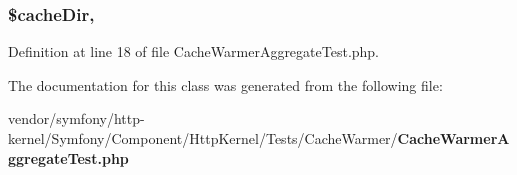 \subsubsection[{\$cache\+Dir}]{\setlength{\rightskip}{0pt plus 5cm}\$cache\+Dir\hspace{0.3cm}{\ttfamily [static]}, {\ttfamily [protected]}}\label{class_symfony_1_1_component_1_1_http_kernel_1_1_tests_1_1_cache_warmer_1_1_cache_warmer_aggregate_test_ac9d27ec635bd451cdecc1d20135f0698}


Definition at line 18 of file Cache\+Warmer\+Aggregate\+Test.\+php.



The documentation for this class was generated from the following file\+:\begin{DoxyCompactItemize}
\item 
vendor/symfony/http-\/kernel/\+Symfony/\+Component/\+Http\+Kernel/\+Tests/\+Cache\+Warmer/{\bf Cache\+Warmer\+Aggregate\+Test.\+php}\end{DoxyCompactItemize}
